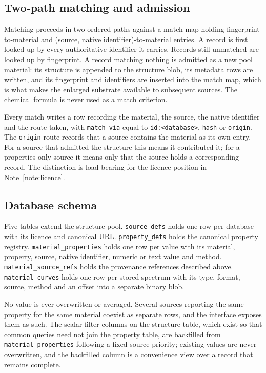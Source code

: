 \subsection{Two-path matching and admission}

Matching proceeds in two ordered paths against a match map holding
fingerprint-to-material and (source, native identifier)-to-material entries. A
record is first looked up by every authoritative identifier it carries. Records
still unmatched are looked up by fingerprint. A record matching nothing is
admitted as a new pool material: its structure is appended to the structure blob,
its metadata rows are written, and its fingerprint and identifiers are inserted
into the match map, which is what makes the enlarged substrate available to
subsequent sources. The chemical formula is never used as a match criterion.

Every match writes a row recording the material, the source, the native
identifier and the route taken, with \texttt{match\_via} equal to
\texttt{id:<database>}, \texttt{hash} or \texttt{origin}. The \texttt{origin}
route records that a source contains the material as its own entry. For a source
that admitted the structure this means it contributed it; for a properties-only
source it means only that the source holds a corresponding record. The
distinction is load-bearing for the licence position in
Note~\ref{note:licence}.

\subsection{Database schema}

Five tables extend the structure pool. \texttt{source\_defs} holds one row per
database with its licence and canonical URL. \texttt{property\_defs} holds the
canonical property registry. \texttt{material\_properties} holds one row per
value with its material, property, source, native identifier, numeric or text
value and method. \texttt{material\_source\_refs} holds the provenance references
described above. \texttt{material\_curves} holds one row per stored spectrum with
its type, format, source, method and an offset into a separate binary blob.

No value is ever overwritten or averaged. Several sources reporting the same
property for the same material coexist as separate rows, and the interface
exposes them as such. The scalar filter columns on the structure table, which
exist so that common queries need not join the property table, are backfilled
from \texttt{material\_properties} following a fixed source priority; existing
values are never overwritten, and the backfilled column is a convenience view
over a record that remains complete.

